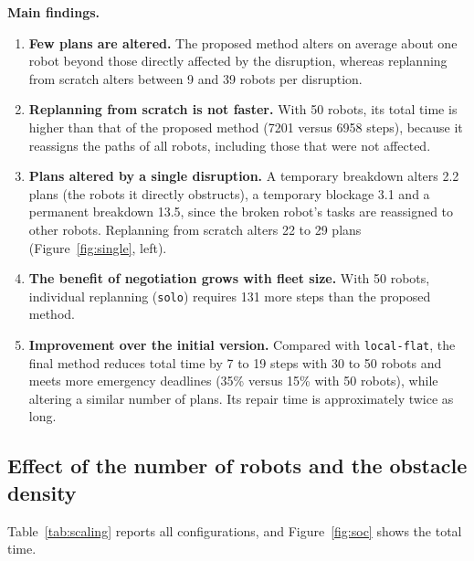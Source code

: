 \documentclass[11pt,a4paper]{article}
\begin{document}
\textbf{Main findings.}
\begin{enumerate}\setlength{\itemsep}{2pt}
  \item \textbf{Few plans are altered.} The proposed method alters on average about one robot
        beyond those directly affected by the disruption, whereas replanning from scratch alters
        between 9 and 39 robots per disruption.
  \item \textbf{Replanning from scratch is not faster.} With 50 robots, its total time is higher
        than that of the proposed method (7201 versus 6958 steps), because it reassigns the paths
        of all robots, including those that were not affected.
  \item \textbf{Plans altered by a single disruption.} A temporary breakdown alters 2.2 plans (the
        robots it directly obstructs), a temporary blockage 3.1 and a permanent breakdown 13.5,
        since the broken robot's tasks are reassigned to other robots. Replanning from scratch
        alters 22 to 29 plans (Figure~\ref{fig:single}, left).
  \item \textbf{The benefit of negotiation grows with fleet size.} With 50 robots, individual
        replanning (\texttt{solo}) requires 131 more steps than the proposed method.
  \item \textbf{Improvement over the initial version.} Compared with \texttt{local-flat}, the
        final method reduces total time by 7 to 19 steps with 30 to 50 robots and meets more
        emergency deadlines (35\% versus 15\% with 50 robots), while altering a similar number of
        plans. Its repair time is approximately twice as long.
\end{enumerate}

\subsection*{Effect of the number of robots and the obstacle density}
Table~\ref{tab:scaling} reports all configurations, and Figure~\ref{fig:soc} shows the total time.
\end{document}

